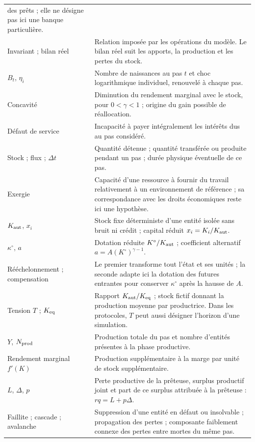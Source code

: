 \begin{small}
\begin{longtable}{@{}>{\raggedright\arraybackslash}p{.27\linewidth}p{.66\linewidth}@{}}
des prêts ; elle ne désigne pas ici une banque particulière. \\
Invariant ; bilan réel & Relation imposée par les opérations du modèle.
Le bilan réel suit les apports, la production et les pertes du stock. \\
$B_t$, $\eta_i$ & Nombre de naissances au pas $t$ et choc logarithmique
individuel, renouvelé à chaque pas. \\
Concavité & Diminution du rendement marginal avec le stock, pour
$0<\gamma<1$ ; origine du gain possible de réallocation. \\
Défaut de service & Incapacité à payer intégralement les intérêts dus
au pas considéré. \\
Stock ; flux ; $\Delta t$ & Quantité détenue ; quantité transférée ou
produite pendant un pas ; durée physique éventuelle de ce pas. \\
Exergie & Capacité d'une ressource à fournir du travail relativement à
un environnement de référence ; sa correspondance avec les droits
économiques reste ici une hypothèse. \\
$K_{\rm aut}$, $x_i$ & Stock fixe déterministe d'une entité isolée
sans bruit ni crédit ; capital réduit $x_i=K_i/K_{\rm aut}$. \\
$\kappa^\circ$, $a$ & Dotation réduite $K^\circ/K_{\rm aut}$ ;
coefficient alternatif $a=A(K^\circ)^{\gamma-1}$. \\
Rééchelonnement ; compensation & Le premier transforme tout l'état et
ses unités ; la seconde adapte ici la dotation des futures entrantes
pour conserver $\kappa^\circ$ après la hausse de $A$. \\
Tension $T$ ; $K_{\rm eq}$ & Rapport $K_{\rm aut}/K_{\rm eq}$ ;
stock fictif donnant la production moyenne par productrice.
Dans les protocoles, $T$ peut aussi désigner l'horizon d'une simulation. \\
$Y$, $N_{\rm prod}$ & Production totale du pas et nombre d'entités
présentes à la phase productive. \\
Rendement marginal $f'(K)$ & Production supplémentaire à la marge
par unité de stock supplémentaire. \\
$L$, $\Delta$, $p$ & Perte productive de la prêteuse, surplus productif
joint et part de ce surplus attribuée à la prêteuse : $rq=L+p\Delta$. \\
Faillite ; cascade ; avalanche & Suppression d'une entité en défaut
ou insolvable ; propagation des pertes ; composante faiblement connexe
des pertes entre mortes du même pas. \\

\end{longtable}
\end{small}
